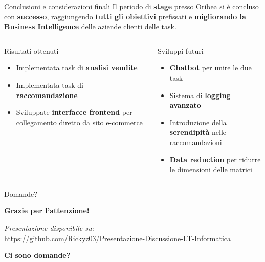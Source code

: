 \documentclass{beamer}
\begin{document}
	\begin{frame}{Conclusioni e considerazioni finali}
		Il periodo di \textbf{stage} presso Oribea si è concluso con \textbf{successo}, raggiungendo \textbf{tutti gli obiettivi} prefissati e \textbf{migliorando la Business Intelligence} delle aziende clienti delle task.

		\begin{columns}
			\begin{column}{0.48\textwidth}
				\begin{block}{Risultati ottenuti}
					\begin{itemize}
						\item Implementata task di \textbf{analisi vendite}
						\item Implementata task di \textbf{raccomandazione}
						\item Sviluppate \textbf{interfacce frontend} per collegamento diretto da sito e-commerce
					\end{itemize}
				\end{block}
			\end{column}
			\begin{column}{0.52\textwidth}
				\begin{alertblock}{Sviluppi futuri}
					\begin{itemize}
						\item \textbf{Chatbot} per unire le due task
						\item Sistema di \textbf{logging avanzato}
						\item Introduzione della \textbf{serendipità} nelle raccomandazioni
						\item \textbf{Data reduction} per ridurre le dimensioni delle matrici
					\end{itemize}
				\end{alertblock}
			\end{column}
		\end{columns}
	\end{frame}

	\begin{frame}{Domande?}
		\begin{center}
			\Large
			\textbf{Grazie per l'attenzione!}
			
			\vspace{1em}
			
			\normalsize
			\textit{Presentazione disponibile su:}\\
			\url{https://github.com/Rickyz03/Presentazione-Discussione-LT-Informatica}
			
			\vspace{2em}
			
			\Large
			\textbf{Ci sono domande?}
		\end{center}
	\end{frame}
\end{document}
